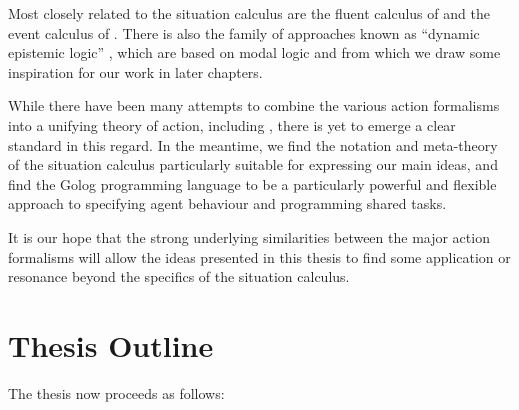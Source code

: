 Most closely related to the situation calculus are the fluent calculus
of \citet{thielscher98fluent_calculus} and the event calculus of
\citet{kowalski86event_calculus}. There is also the family of approaches
known as {}``dynamic epistemic logic'' \citep{baltag98pa_ck,vanBenthem06lcc,vanBentham06tree_of_knowledge},
which are based on modal logic and from which we draw some inspiration
for our work in later chapters.

While there have been many attempts to combine the various action
formalisms into a unifying theory of action, including \citep{belleghem95combine_sitcalc_evtcalc,kowalski97reconcile_sitcalc_evtcalc,thielscher06reconcile_sc_fc,thielscher07unifying_action_calculus},
there is yet to emerge a clear standard in this regard. In the meantime,
we find the notation and meta-theory of the situation calculus particularly
suitable for expressing our main ideas, and find the Golog programming
language to be a particularly powerful and flexible approach to specifying
agent behaviour and programming shared tasks.

It is our hope that the strong underlying similarities between the
major action formalisms will allow the ideas presented in this thesis
to find some application or resonance beyond the specifics of the
situation calculus.\newpage{}


\section{Thesis Outline}

The thesis now proceeds as follows:

